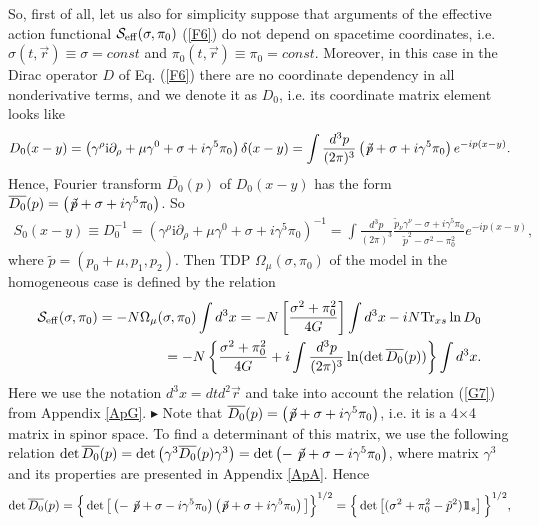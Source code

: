 \documentclass[12pt,a4paper]{article}
\begin{document}
So, first of all, let us also for simplicity suppose  that arguments of the effective
action functional  ${\cal S}_{\rm {eff}}(\sigma,\pi_0)$ (\ref{F6}) do not depend on spacetime
coordinates, i.e. $\sigma(t,\vec r)\equiv\sigma=const$ and $\pi_0(t,\vec r)\equiv\pi_0=const$.
Moreover, in this case in the Dirac operator $D$ of Eq. (\ref{F6}) there are no coordinate
dependency in all nonderivative terms, and we denote it as $D_0$, i.e. its coordinate matrix
element looks like $$D_0(x-y)=\left(\gamma^\rho\mathrm{i}\partial_\rho
+\mu\gamma^0+\sigma +i\gamma^5\pi_0\right)\delta (x-y)=
\int\frac{d^3p}{(2\pi)^3}\left(\not\!{\tilde p}+\sigma+i\gamma^5\pi_0\right)e^{-ip(x-y)}.$$
Hence, Fourier transform $\overline{D_0}(p)$ of $D_0(x-y)$ has the form $\overline{D_0}(p)=
\left(\not\!{\tilde p}+\sigma+i\gamma^5\pi_0\right)$. So
\begin{eqnarray}
S_0(x-y)\equiv D_0^{-1}=\left(\gamma^\rho\mathrm{i}\partial_\rho
+\mu\gamma^0+\sigma +i\gamma^5\pi_0\right)^{-1}
=\int\frac{d^3p}{(2\pi)^3}\frac{\tilde p_\nu\gamma^\nu-\sigma+i\gamma^5\pi_0}
{\tilde p^2-\sigma^2-\pi^2_0}e^{-ip(x-y)},\label{F8}
\end{eqnarray}
where $\tilde p=(p_0+\mu,p_1,p_2)$. Then TDP
$\Omega_\mu (\sigma,\pi_0)$ of the model in the homogeneous case is defined by the relation
\begin{eqnarray}
{\cal S}_{\rm {eff}}(\sigma,\pi_0)=-N\Omega_\mu (\sigma,\pi_0)\int d^3x
=-N\left[\frac{\sigma^2+\pi^2_0}{4G}\right]\int d^3x-iN {\rm Tr}_{xs}\ln D_0\nonumber\\=
-N\left\{\frac{\sigma^2+\pi^2_0}{4G}+i\int\frac{d^3p}{(2\pi)^3}
\ln(\det\overline{D_0}(p))\right\}\int d^3x.
\label{F9}
\end{eqnarray}
Here we use the notation $d^3x=dtd^2\vec r$ and take into account the relation (\ref{G7}) from
Appendix \ref{ApG}. $\blacktriangleright$ Note that $\overline{D_0}(p)=\left(\not\!{\tilde p}+\sigma+i\gamma^5\pi_0\right)$,
i.e. it is a 4$\times$4 matrix in spinor space. To find a determinant of this matrix, we use the following
relation $\det\overline{D_0}(p)=\det\left(\gamma^3\overline{D_0}(p)\gamma^3\right)=\det
\left(-\not\!{\tilde p}+\sigma-i\gamma^5\pi_0\right)$, where matrix $\gamma^3$ and its properties
are presented in Appendix \ref{ApA}. Hence
\begin{eqnarray}
\det\overline{D_0}(p)=\Big\{\det\big[\left(-\not\!{\tilde p}+\sigma-i\gamma^5\pi_0\right)
\left(\not\!{\tilde p}+\sigma+i\gamma^5\pi_0\right)\big]\Big\}^{1/2}=
\Big\{\det\left[(\sigma^2+\pi_0^2-\tilde p^2)1\!\!1_s\right]\Big\}^{1/2},\label{F10}
\end{eqnarray}
\end{document}
